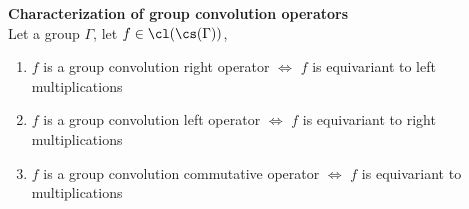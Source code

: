 \begin{theorem}\textbf{Characterization of group convolution operators}\\
Let a group $\Gamma$, let $f \in \cl(\cs(\Gamma))$,
\begin{enumerate}[nolistsep,noitemsep,label=(\roman*)]
  \item $f$ is a group convolution right operator $\Leftrightarrow$ $f$ is equivariant to left multiplications \label{enum:p}
  \item $f$ is a group convolution left operator $\Leftrightarrow$ $f$ is equivariant to right multiplications \label{enum:pp}
  \item $f$ is a group convolution commutative operator $\Leftrightarrow$ $f$ is equivariant to multiplications \label{enum:ppp}%
\end{enumerate}
\label{th:cgco}
\end{theorem}
